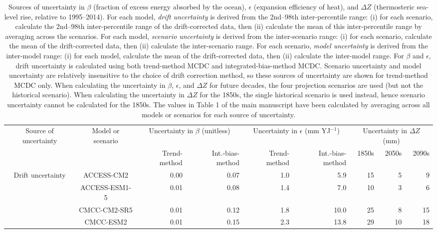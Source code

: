 \begin{table*}[t]
\centering
\caption{Sources of uncertainty in $\beta$ (fraction of excess energy absorbed by the ocean), $\epsilon$ (expansion efficiency of heat), and ${\Delta}Z$ (thermosteric sea-level rise, relative to 1995--2014). For each model, \emph{drift uncertainty} is derived from the 2nd--98th inter-percentile range: (i) for each scenario, calculate the 2nd--98th inter-percentile range of the drift-corrected data, then (ii) calculate the mean of this inter-percentile range by averaging across the scenarios. For each model, \emph{scenario uncertainty} is derived from the inter-scenario range: (i) for each scenario, calculate the mean of the drift-corrected data, then (ii) calculate the inter-scenario range. For each scenario, \emph{model uncertainty} is derived from the inter-model range: (i) for each model, calculate the mean of the drift-corrected data, then (ii) calculate the inter-model range. For $\beta$ and $\epsilon$, drift uncertainty is calculated using both trend-method MCDC and integrated-bias-method MCDC. Scenario uncertainty and model uncertainty are relatively insensitive to the choice of drift correction method, so these sources of uncertainty are shown for trend-method MCDC only. When calculating the uncertainty in $\beta$, $\epsilon$, and ${\Delta}Z$ for future decades, the four projection scenarios are used (but not the historical scenario). When calculating the uncertainty in ${\Delta}Z$ for the 1850s, the single historical scenario is used instead, hence scenario uncertainty cannot be calculated for the 1850s. The values in Table 1 of the main manuscript have been calculated by averaging across all models or scenarios for each source of uncertainty.}
\begin{tabular}{c|c|rr|rr|rrr}
\toprule
Source of uncertainty & Model or scenario & \multicolumn{2}{c|}{Uncertainty in $\beta$ (unitless)} & \multicolumn{2}{c|}{Uncertainty in $\epsilon$ (mm YJ$^{-1}$)} & \multicolumn{3}{c}{Uncertainty in ${\Delta}Z$ (mm)} \\
 &  & Trend-method & Int.-bias-method & Trend-method & Int.-bias-method & 1850s & 2050s & 2090s \\
\midrule
\multirow[c]{20}{*}{Drift uncertainty} & ACCESS-CM2 & 0.00 & 0.07 & 1.0 & 5.9 & 15 & 5 & 9 \\
 & ACCESS-ESM1-5 & 0.01 & 0.08 & 1.4 & 7.0 & 10 & 3 & 6 \\
 & CMCC-CM2-SR5 & 0.01 & 0.12 & 1.8 & 10.0 & 25 & 8 & 15 \\
 & CMCC-ESM2 & 0.01 & 0.15 & 2.3 & 13.8 & 29 & 10 & 18 \\

\end{tabular}
\end{table*}
